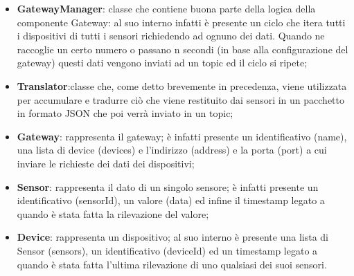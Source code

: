 \begin{landscape}
\begin{itemize}
		\item \textbf{GatewayManager}: classe che contiene buona parte della logica della componente Gateway: al suo interno infatti è presente un ciclo che itera tutti i dispositivi di tutti i sensori richiedendo ad ognuno dei dati. Quando ne raccoglie un certo numero o passano n secondi (in base alla configurazione del gateway) questi dati vengono inviati ad un topic ed il ciclo si ripete;
		\item \textbf{Translator}:classe che, come detto brevemente in precedenza, viene utilizzata per accumulare e tradurre ciò che viene restituito dai sensori in un pacchetto in formato JSON che poi verrà inviato in un topic;
		\item \textbf{Gateway}: rappresenta il gateway; è infatti presente un identificativo (name), una lista di device (devices) e l'indirizzo (address) e la porta (port) a cui inviare le richieste dei dati dei dispositivi;
		\item \textbf{Sensor}: rappresenta il dato di un singolo sensore; è infatti presente un identificativo (sensorId), un valore (data) ed infine il timestamp legato a quando è stata fatta la rilevazione del valore;
		\item \textbf{Device}: rappresenta un dispositivo; al suo interno è presente una lista di Sensor (sensors), un identificativo (deviceId) ed un timestamp legato a quando è stata fatta l'ultima rilevazione di uno qualsiasi dei suoi sensori.
	\end{itemize}
	\end{landscape}
		
